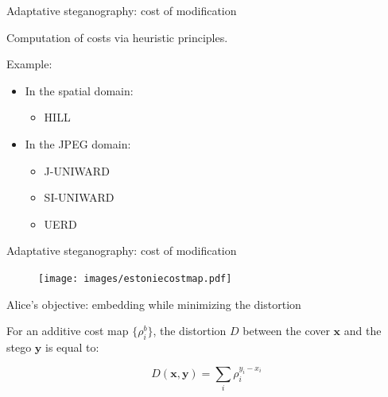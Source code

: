 \documentclass[10pt]{beamer}
\renewcommand{\vec}[1]{\mathbf{#1}}
\begin{document}
\begin{frame}{Adaptative steganography: cost of modification}




Computation of costs via \alert{heuristic principles}. 

Example:
\begin{itemize}
    \item In the spatial domain:
        \begin{itemize}
            \item HILL~\cite{hill}
        \end{itemize}
    \item In the JPEG domain:
        \begin{itemize}
            \item J-UNIWARD~\cite{juni}
            \item SI-UNIWARD~\cite{juni}
            \item UERD~\cite{uerd}
        \end{itemize}
    
\end{itemize}

\end{frame}




\begin{frame}{Adaptative steganography: cost of modification}
\begin{figure}[h]
\texttt{[image: images/estoniecostmap.pdf]}
\end{figure}
\end{frame}

\begin{frame}{Alice's objective: embedding while minimizing the distortion}

\begin{tcolorbox}[colback=lightgreen,colframe=greentheme,title=\textbf{Definition} (Distortion)]
For an additive cost map $\{\rho_i^b\}$, the  distortion $D$ between the cover $\vec{x}$ and the stego $\vec{y}$ is equal to:

\begin{equation}
D(\mathbf{x},\mathbf{y}) = \sum_i \rho_i^{y_i - x_i}
\end{equation}

\end{tcolorbox}
\end{frame}
\end{document}
